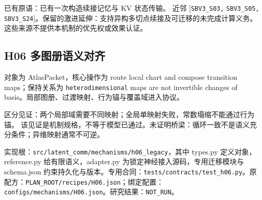 \documentclass[
  10pt,
]{article}
\begin{document}
已有原语：已有一次构造续接记忆与 KV 状态传输。 近邻
{[}\nolinkurl{SBV3_S03,} \nolinkurl{SBV3_S05,}
\nolinkurl{SBV3_S24}{]}。保留的激进延伸：支持异构多切点续接及可迁移的未完成计算义务。
这些来源不提供本机制的优先权或效果认证。

\subsection{H06
多图册语义对齐}\label{h06-ux591aux56feux518cux8bedux4e49ux5bf9ux9f50}

对象为 AtlasPacket，核心操作为 route local chart and compose transition
maps；保持关系为 \nolinkurl{heterodimensional} maps are not invertible
changes of basis。局部图册、过渡映射、行为锚与覆盖域进入协议。

区分见证：两个局部域需要不同映射；全局单映射失败，常数塌缩不能通过行为锚。
该见证是机制规格，不等于模型已通过。未证明桥梁：循环一致不是语义充分条件；异维映射通常不可逆。

实现根：{\small\nolinkurl{src/latent_comm/mechanisms/h06_legacy}}，其中
types.py 定义对象，reference.py 给有限语义，adapter.py
为锁定神经接入源码，专用迁移模块与 schema.json
约束持久化与版本。专用合同：{\small\nolinkurl{tests/contracts/test_h06.py}}。原配方：{\small\nolinkurl{PLAN_ROOT/recipes/H06.json}}；绑定配置：{\small\nolinkurl{configs/mechanisms/H06.json}}。研究结果：\nolinkurl{NOT_RUN}。
\end{document}
